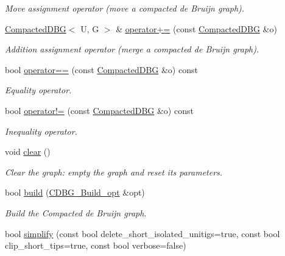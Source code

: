 \begin{DoxyCompactItemize}
\begin{DoxyCompactList}\small\item\em Move assignment operator (move a compacted de Bruijn graph). \end{DoxyCompactList}\item 
\hyperlink{classCompactedDBG}{Compacted\+D\+BG}$<$ U, G $>$ \& \hyperlink{classCompactedDBG_af689cbbbe9328a0bd4f80eb8c0547e3c}{operator+=} (const \hyperlink{classCompactedDBG}{Compacted\+D\+BG} \&o)
\begin{DoxyCompactList}\small\item\em Addition assignment operator (merge a compacted de Bruijn graph). \end{DoxyCompactList}\item 
bool \hyperlink{classCompactedDBG_a59b674356405c7c80bfbd7751d0d1aff}{operator==} (const \hyperlink{classCompactedDBG}{Compacted\+D\+BG} \&o) const
\begin{DoxyCompactList}\small\item\em Equality operator. \end{DoxyCompactList}\item 
bool \hyperlink{classCompactedDBG_ae3039c04c5f7234281f4e8c04fffd0bc}{operator!=} (const \hyperlink{classCompactedDBG}{Compacted\+D\+BG} \&o) const
\begin{DoxyCompactList}\small\item\em Inequality operator. \end{DoxyCompactList}\item 
\mbox{\label{classCompactedDBG_ac85b803c8f7527ed3c68054b77224d6d}} 
void \hyperlink{classCompactedDBG_ac85b803c8f7527ed3c68054b77224d6d}{clear} ()
\begin{DoxyCompactList}\small\item\em Clear the graph\+: empty the graph and reset its parameters. \end{DoxyCompactList}\item 
bool \hyperlink{classCompactedDBG_a6021ad2fe7b11998b886bc5fd9e1a4ba}{build} (\hyperlink{structCDBG__Build__opt}{C\+D\+B\+G\+\_\+\+Build\+\_\+opt} \&opt)
\begin{DoxyCompactList}\small\item\em Build the Compacted de Bruijn graph. \end{DoxyCompactList}\item 
bool \hyperlink{classCompactedDBG_aa8c574863bed96d2a9415cbe3d154de6}{simplify} (const bool delete\+\_\+short\+\_\+isolated\+\_\+unitigs=true, const bool clip\+\_\+short\+\_\+tips=true, const bool verbose=false)

\end{DoxyCompactItemize}
